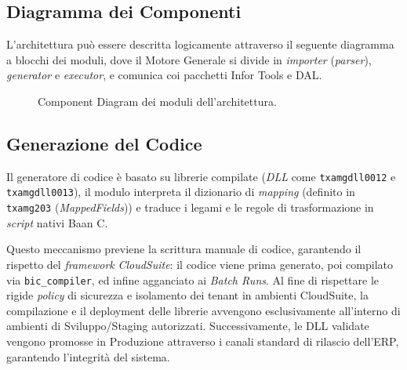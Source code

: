 \subsection{Diagramma dei Componenti}\label{subsec:diagramma-dei-componenti}
L'architettura può essere descritta logicamente attraverso il seguente diagramma a blocchi dei moduli, dove il
Motore Generale si divide in \textit{importer} (\textit{parser}), \textit{generator} e \textit{executor}, e comunica coi pacchetti Infor Tools e DAL\@.
\begin{figure}[H]
    \centering
    \caption{Component Diagram dei moduli dell'architettura.}
    \label{fig:component_diagram}
\end{figure}

\subsection{Generazione del Codice}\label{subsec:generazione-del-codice}
Il generatore di codice è basato su librerie compilate (\textit{DLL} come \texttt{txamgdll0012} e \texttt{txamgdll0013}),
il modulo interpreta il dizionario di \textit{mapping} (definito in \texttt{txamg203} (\textit{MappedFields})) e
traduce i legami e le regole di trasformazione in \textit{script} nativi Baan C.

Questo meccanismo previene la scrittura manuale di codice, garantendo il rispetto del \textit{framework} \textit{CloudSuite}:
il codice viene prima generato, poi compilato via \texttt{bic\_compiler}, ed infine agganciato ai \textit{Batch Runs}.
Al fine di rispettare le rigide \textit{policy} di sicurezza e isolamento dei tenant in ambienti CloudSuite, la compilazione e
il deployment delle librerie avvengono esclusivamente all'interno di ambienti di Sviluppo/Staging autorizzati.
Successivamente, le DLL validate vengono promosse in Produzione attraverso i canali standard di rilascio dell'ERP, garantendo l'integrità del sistema.

